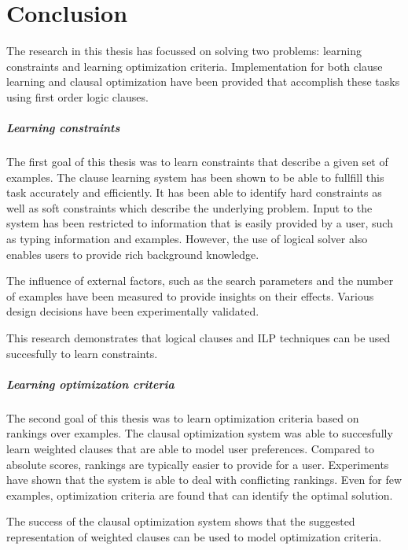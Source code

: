 \chapter{Conclusion}
\label{cha:conclusion}

The research in this thesis has focussed on solving two problems: learning constraints and learning optimization criteria.
Implementation for both clause learning and clausal optimization have been provided that accomplish these tasks using first order logic clauses.

\paragraph{Learning constraints}
The first goal of this thesis was to learn constraints that describe a given set of examples.
The clause learning system has been shown to be able to fullfill this task accurately and efficiently.
It has been able to identify hard constraints as well as soft constraints which describe the underlying problem.
Input to the system has been restricted to information that is easily provided by a user, such as typing information and examples.
However, the use of logical solver also enables users to provide rich background knowledge.

The influence of external factors, such as the search parameters and the number of examples have been measured to provide insights on their effects.
Various design decisions have been experimentally validated.

This research demonstrates that logical clauses and ILP techniques can be used succesfully to learn constraints.

\paragraph{Learning optimization criteria}
The second goal of this thesis was to learn optimization criteria based on rankings over examples.
The clausal optimization system was able to succesfully learn weighted clauses that are able to model user preferences.
Compared to absolute scores, rankings are typically easier to provide for a user.
Experiments have shown that the system is able to deal with conflicting rankings.
Even for few examples, optimization criteria are found that can identify the optimal solution.

The success of the clausal optimization system shows that the suggested representation of weighted clauses can be used to model optimization criteria.

